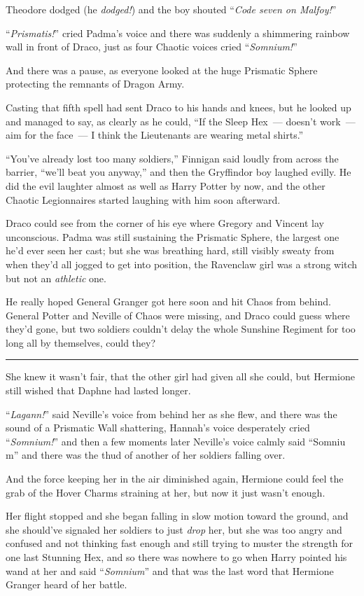 Theodore dodged (he \emph{dodged!}) and the boy shouted ``\emph{Code seven on Malfoy!}''

``\emph{Prismatis!}'' cried Padma's voice and there was suddenly a shimmering rainbow wall in front of Draco, just as four Chaotic voices cried ``\emph{Somnium!}''

And there was a pause, as everyone looked at the huge Prismatic Sphere protecting the remnants of Dragon Army.

Casting that fifth spell had sent Draco to his hands and knees, but he looked up and managed to say, as clearly as he could, ``If the Sleep Hex~--- doesn't work~--- aim for the face~--- I think the Lieutenants are wearing metal shirts.''

``You've already lost too many soldiers,'' Finnigan said loudly from across the barrier, ``we'll beat you anyway,'' and then the Gryffindor boy laughed evilly. He did the evil laughter almost as well as Harry Potter by now, and the other Chaotic Legionnaires started laughing with him soon afterward.

Draco could see from the corner of his eye where Gregory and Vincent lay unconscious. Padma was still sustaining the Prismatic Sphere, the largest one he'd ever seen her cast; but she was breathing hard, still visibly sweaty from when they'd all jogged to get into position, the Ravenclaw girl was a strong witch but not an \emph{athletic} one.

He really hoped General Granger got here soon and hit Chaos from behind. General Potter and Neville of Chaos were missing, and Draco could guess where they'd gone, but two soldiers couldn't delay the whole Sunshine Regiment for too long all by themselves, could they?

\begin{center}\rule{3in}{0.4pt}\end{center}

She knew it wasn't fair, that the other girl had given all she could, but Hermione still wished that Daphne had lasted longer.

``\emph{Lagann!}'' said Neville's voice from behind her as she flew, and there was the sound of a Prismatic Wall shattering, Hannah's voice desperately cried ``\emph{Somnium!}'' and then a few moments later Neville's voice calmly said ``Somniu m'' and there was the thud of another of her soldiers falling over.

And the force keeping her in the air diminished again, Hermione could feel the grab of the Hover Charms straining at her, but now it just wasn't enough.

Her flight stopped and she began falling in slow motion toward the ground, and she should've signaled her soldiers to just \emph{drop} her, but she was too angry and confused and not thinking fast enough and still trying to muster the strength for one last Stunning Hex, and so there was nowhere to go when Harry pointed his wand at her and said ``\emph{Somnium}'' and that was the last word that Hermione Granger heard of her battle.
